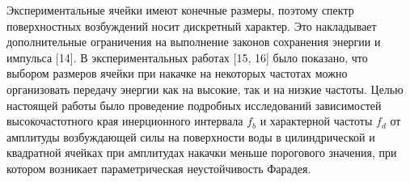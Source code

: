 Экспериментальные ячейки имеют конечные размеры, поэтому спектр поверхностных возбуждений носит дискретный характер. Это накладывает дополнительные ограничения на выполнение законов сохранения энергии и импульса [14]. В экспериментальных работах [15, 16] было показано, что выбором размеров ячейки при накачке на некоторых частотах можно организовать передачу энергии как на высокие, так и на низкие частоты.
Целью настоящей работы было проведение подробных исследований зависимостей высокочастотного края инерционного интервала $f_b$ и характерной частоты $f_d$ от амплитуды возбуждающей силы на поверхности воды в цилиндрической и квадратной ячейках при амплитудах накачки меньше порогового значения, при котором возникает параметрическая неустойчивость Фарадея.

